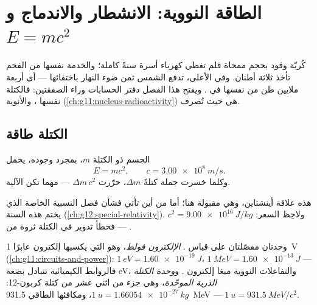 \chapter{الطاقة النووية: الانشطار والاندماج و$E=mc^2$}\label{ch:g12:nuclear-energy}

كُريّة وقود بحجم ممحاة قلم تغطي كهرباء أسرة
سنةً كاملة؛ والخدمة نفسها من الفحم تأخذ ثلاثة أطنان. وفي الأعلى، تدفع الشمس
ثمن ضوء النهار باختفائها --- أي أربعة ملايين طن من نفسها في .
ويفتح هذا الفصل دفتر الحسابات وراء الصفقتين: فالكتلة نفسها
، والأنوية (\cref{ch:g11:nucleus-radioactivity}) هي حيث تُصرف.

\section{الكتلة طاقة}

\begin{theorem}\label{thm:g12:nuclear-energy:emc2}
الجسم ذو الكتلة $m$، بمجرد وجوده، يحمل 
\[
E = m c^2, \qquad c = \qty{3.00e8}{m/s}.
\]
وكلما خسرت جملة كتلةً $\Delta m$، حرّرت 
$\Delta m\, c^2$ --- مهما تكن الآلية.
\end{theorem}
\admitted

\begin{remark}[أينشتاين، 1905]\label{rem:g12:nuclear-energy:einstein}
هذه علاقة أينشتاين، وهي مقبولة هنا؛ أما من أين تأتي فشأن
فصل النسبية الخاصة الذي يختم هذه السنة
(\cref{ch:g12:special-relativity}). ولاحِظ السعر: $c^2 = \qty{9.00e16}{J/kg}$
--- فخطأ تدوير في الكتلة ثروة من .
\end{remark}

\begin{definition}\label{def:g12:nuclear-energy:units}
وحدتان مفصّلتان على قياس .
\emph{الإلكترون فولط}، وهو  التي يكسبها إلكترون
عابرًا \qty{1}{V} (\cref{ch:g11:circuits-and-power}):
$\qty{1}{eV} = \qty{1.60e-19}{J}$، $\qty{1}{MeV} = \qty{1.60e-13}{J}$ ---
فالروابط الكيميائية تتبادل بضعة \unit{eV}، والتفاعلات النووية ميغا إلكترون .
و\emph{وحدة الكتلة الذرية الموحّدة}، وهي
جزء من اثني عشر من كتلة  كربون-12: $\qty{1}{u} = \qty{1.66054e-27}{kg}$،
ومكافئها الطاقي \qty{931.5}{MeV} --- $\qty{1}{u} = \qty{931.5}{MeV}/c^2$.
\end{definition}

